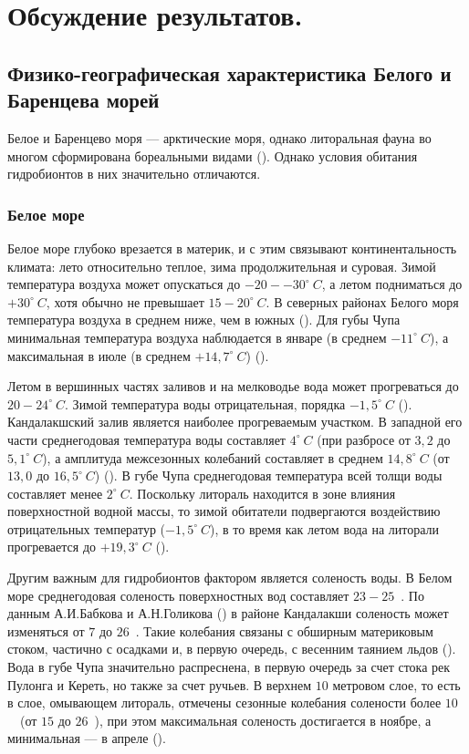 		\section{Обсуждение результатов.}

	\subsection{Физико-географическая характеристика Белого и Баренцева морей}
Белое и Баренцево моря --- арктические моря, однако литоральная фауна во многом сформирована бореальными видами (\cite{Zenkevich_1963}).
Однако условия обитания гидробионтов в них значительно отличаются.

	\subsubsection{Белое море}

Белое море глубоко врезается в материк, и с этим связывают континентальность климата: лето относительно теплое, зима продолжительная и суровая. 
Зимой температура воздуха может опускаться до $-20 - -30^{\circ}\ C$, а летом подниматься до $+30^{\circ}\ C$, хотя обычно не превышает $15-20^{\circ}\ C$. 
В северных районах Белого моря температура воздуха в среднем ниже, чем в южных (\cite{Babkov_Golikov_1984}). 
Для губы Чупа минимальная температура воздуха наблюдается в январе (в среднем $-11^{\circ}\ C$), а максимальная в июле (в среднем $+14,7^{\circ}\ C$) (\cite{Babkov_1982}). 

Летом в вершинных частях заливов и на мелководье вода может прогреваться до $20 - 24^{\circ}\ C$. 
Зимой температура воды отрицательная, порядка $-1,5^{\circ}\ C$ (\cite{Babkov_Golikov_1984}).
Кандалакшский залив является наиболее прогреваемым участком. 
В западной его части среднегодовая температура воды составляет $4^{\circ}\ C$ (при разбросе от $3,2$ до $5,1^{\circ}\ C$), а амплитуда межсезонных колебаний составляет в среднем $14,8^{\circ}\ C$ (от $13,0$ до $16,5^{\circ}\ C$) (\cite{Kuznecov_1960}). 
В губе Чупа среднегодовая температура всей толщи воды составляет менее $2^{\circ}\ C$. 
Поскольку литораль находится в зоне влияния поверхностной водной массы, то зимой обитатели подвергаются воздействию отрицательных температур ($-1,5^{\circ}\ C$), в то время как летом вода на литорали прогревается до $+19,3^{\circ}\ C$ (\cite{Babkov_1982}). 

Другим важным для гидробионтов фактором является соленость воды. 
В Белом море среднегодовая соленость поверхностных вод составляет $23-25$~\permil. 
По данным А.И.Бабкова и А.Н.Голикова (\cite*{Babkov_Golikov_1984}) в районе Кандалакши соленость может изменяться от $7$ до $26$~\permil. 
Такие колебания связаны с обширным материковым стоком, частично с осадками и, в первую очередь, с весенним таянием льдов (\cite{Naumov_Fedyakov_1993}).
Вода в губе Чупа значительно распреснена, в первую очередь за счет стока рек Пулонга и Кереть, но также за счет ручьев. 
В верхнем $10$ метровом слое, то есть в слое, омывающем литораль, отмечены сезонные колебания солености более $10$~\permil\ (от $15$ до $26$~\permil), при этом максимальная соленость достигается в ноябре, а минимальная --- в апреле (\cite{Babkov_1982}). 

